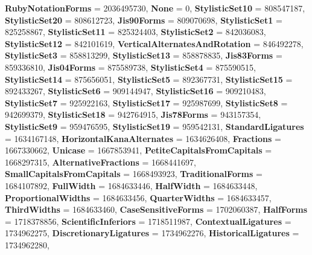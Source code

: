 \begin{DoxyCompactItemize}
{\bfseries Ruby\+Notation\+Forms} = 2036495730, 
\newline
{\bfseries None} = 0, 
{\bfseries Stylistic\+Set10} = 808547187, 
{\bfseries Stylistic\+Set20} = 808612723, 
{\bfseries Jis90\+Forms} = 809070698, 
\newline
{\bfseries Stylistic\+Set1} = 825258867, 
{\bfseries Stylistic\+Set11} = 825324403, 
{\bfseries Stylistic\+Set2} = 842036083, 
{\bfseries Stylistic\+Set12} = 842101619, 
\newline
{\bfseries Vertical\+Alternates\+And\+Rotation} = 846492278, 
{\bfseries Stylistic\+Set3} = 858813299, 
{\bfseries Stylistic\+Set13} = 858878835, 
{\bfseries Jis83\+Forms} = 859336810, 
\newline
{\bfseries Jis04\+Forms} = 875589738, 
{\bfseries Stylistic\+Set4} = 875590515, 
{\bfseries Stylistic\+Set14} = 875656051, 
{\bfseries Stylistic\+Set5} = 892367731, 
\newline
{\bfseries Stylistic\+Set15} = 892433267, 
{\bfseries Stylistic\+Set6} = 909144947, 
{\bfseries Stylistic\+Set16} = 909210483, 
{\bfseries Stylistic\+Set7} = 925922163, 
\newline
{\bfseries Stylistic\+Set17} = 925987699, 
{\bfseries Stylistic\+Set8} = 942699379, 
{\bfseries Stylistic\+Set18} = 942764915, 
{\bfseries Jis78\+Forms} = 943157354, 
\newline
{\bfseries Stylistic\+Set9} = 959476595, 
{\bfseries Stylistic\+Set19} = 959542131, 
{\bfseries Standard\+Ligatures} = 1634167148, 
{\bfseries Horizontal\+Kana\+Alternates} = 1634626408, 
\newline
{\bfseries Fractions} = 1667330662, 
{\bfseries Unicase} = 1667853941, 
{\bfseries Petite\+Capitals\+From\+Capitals} = 1668297315, 
{\bfseries Alternative\+Fractions} = 1668441697, 
\newline
{\bfseries Small\+Capitals\+From\+Capitals} = 1668493923, 
{\bfseries Traditional\+Forms} = 1684107892, 
{\bfseries Full\+Width} = 1684633446, 
{\bfseries Half\+Width} = 1684633448, 
\newline
{\bfseries Proportional\+Widths} = 1684633456, 
{\bfseries Quarter\+Widths} = 1684633457, 
{\bfseries Third\+Widths} = 1684633460, 
{\bfseries Case\+Sensitive\+Forms} = 1702060387, 
\newline
{\bfseries Half\+Forms} = 1718378856, 
{\bfseries Scientific\+Inferiors} = 1718511987, 
{\bfseries Contextual\+Ligatures} = 1734962275, 
{\bfseries Discretionary\+Ligatures} = 1734962276, 
\newline
{\bfseries Historical\+Ligatures} = 1734962280, 

\end{DoxyCompactItemize}
